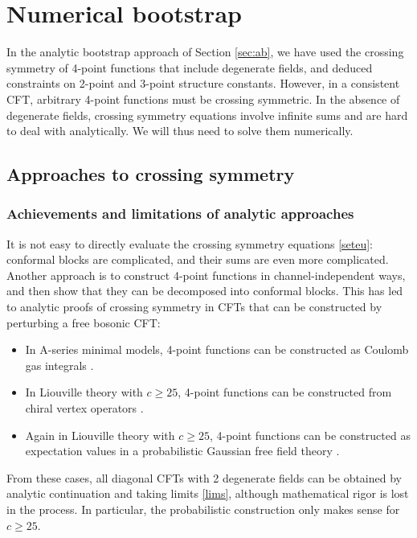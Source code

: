 \documentclass[12pt, a4paper]{article}
\theoremstyle{break}
\begin{document}
\section{Numerical bootstrap}

In the analytic bootstrap approach of Section \ref{sec:ab}, we have used the crossing symmetry of 4-point functions that include degenerate fields, and deduced constraints on 2-point and 3-point structure constants. However, in a consistent CFT, arbitrary 4-point functions must be crossing symmetric. In the absence of degenerate fields, crossing symmetry equations involve infinite sums and are hard to deal with analytically. We will thus need to solve them numerically. 

\subsection{Approaches to crossing symmetry}

\subsubsection{Achievements and limitations of analytic approaches}

It is not easy to directly evaluate the crossing symmetry equations \eqref{seteu}: conformal blocks are complicated, and their sums are even more complicated. Another approach is to construct 4-point functions in channel-independent ways, and then show that they can be decomposed into conformal blocks. This has led to analytic proofs of crossing symmetry in CFTs that can be constructed by perturbing a free bosonic CFT:
\begin{itemize}
 \item In A-series minimal models, 4-point functions can be constructed as Coulomb gas integrals \cite{df84}.
 \item In Liouville theory with $c\geq 25$, 4-point functions can be constructed from chiral vertex operators \cite{tes03b}.
 \item Again in Liouville theory with $c\geq 25$, 4-point functions can be constructed as expectation values in a probabilistic Gaussian free field theory \cite{ckrv05}. 
\end{itemize}
From these cases, all diagonal CFTs with 2 degenerate fields can be obtained by analytic continuation and taking limits \eqref{lims}, although mathematical rigor is lost in the process. In particular, the probabilistic construction only makes sense for $c\geq 25$. 
\end{document}
